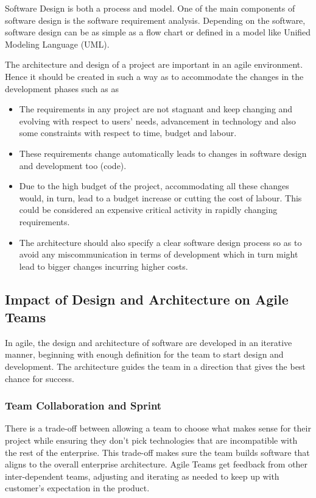 \documentclass[sigplan,screen]{acmart}
\begin{document}
Software Design is both a process and model. One of the main components of software design is the software requirement analysis. Depending on the software, software design can be as simple as a flow chart or defined in a model like Unified Modeling Language (UML). 

The architecture and design of a project are important in an agile environment. Hence it should be created in such a way as to accommodate the changes in the development phases such as as\cite{Architecture04}

\begin{itemize}
\item {}The requirements in any project are not stagnant and keep changing and evolving with respect to users’ needs, advancement in technology and also some constraints with respect to time, budget and labour.
\item {}These requirements change automatically leads to changes in software design and development too (code).
\item {}Due to the high budget of the project, accommodating all these changes would, in turn, lead to a budget increase or cutting the cost of labour. This could be considered an expensive critical activity in rapidly changing requirements.
\item {}The architecture should also specify a clear software design process so as to avoid any miscommunication in terms of development which in turn might lead to bigger changes incurring higher costs.
\end{itemize}


\subsection{Impact of Design and Architecture on Agile Teams}

In agile, the design and architecture of software are developed in an iterative manner, beginning with enough definition for the team to start design and development. The architecture guides the team in a direction that gives the best chance for success.

\subsubsection{Team Collaboration and Sprint}

There is a trade-off between allowing a team to choose what makes sense for their project while ensuring they don’t pick technologies that are incompatible with the rest of the enterprise. This trade-off makes sure the team builds software that aligns to the overall enterprise architecture. Agile Teams get feedback from other inter-dependent teams, adjusting and iterating as needed to keep up with customer’s expectation in the product.
 
\end{document}
